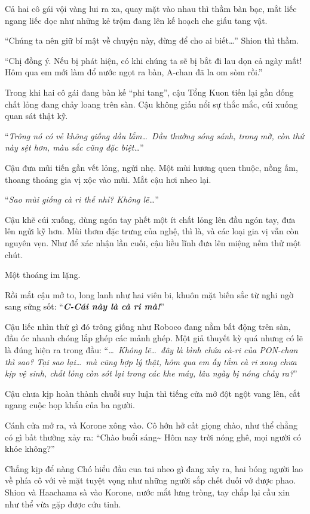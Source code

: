 \documentclass[../main.tex]{subfiles}
\begin{document}
Cả hai cô gái vội vàng lui ra xa, quay mặt vào nhau thì thầm bàn bạc, mắt liếc ngang liếc dọc như những kẻ trộm đang lên kế hoạch che giấu tang vật.

``Chúng ta nên giữ bí mật về chuyện này, đừng để cho ai biết\dots''  Shion thì thầm.

``Chị đồng ý. Nếu bị phát hiện, có khi chúng ta sẽ bị bắt đi lau dọn cả ngày mất! Hôm qua em mới làm đổ nước ngọt ra bàn, A-chan đã la om sòm rồi.''

Trong khi hai cô gái đang bàn kế ``phi tang'', cậu Tổng Kuon tiến lại gần đống chất lỏng đang chảy loang trên sàn. Cậu không giấu nổi sự thắc mắc, cúi xuống quan sát thật kỹ.

``\textit{Trông nó có vẻ không giống dầu lắm\dots\ Dầu thường sóng sánh, trong mờ, còn thứ này sệt hơn, màu sắc cũng đặc biệt\dots}''

Cậu đưa mũi tiến gần vết lỏng, ngửi nhẹ. Một mùi hương quen thuộc, nồng ấm, thoang thoảng gia vị xộc vào mũi. Mắt cậu hơi nheo lại.

``\textit{Sao mùi giống cà ri thế nhỉ? Không lẽ\dots}''

Cậu khẽ cúi xuống, dùng ngón tay phết một ít chất lỏng lên đầu ngón tay, đưa lên ngửi kỹ hơn. Mùi thơm đặc trưng của nghệ, thì là, và các loại gia vị vẫn còn nguyên vẹn. Như để xác nhận lần cuối, cậu liều lĩnh đưa lên miệng nếm thử một chút.

Một thoáng im lặng.

Rồi mắt cậu mở to, long lanh như hai viên bi, khuôn mặt biến sắc từ nghi ngờ sang sửng sốt: ``\textbf{\textit{C-Cái này là cà ri mà!}}''

Cậu liếc nhìn thứ gì đó trông giống như Roboco đang nằm bất động trên sàn, đầu óc nhanh chóng lắp ghép các mảnh ghép. Một giả thuyết kỳ quá  nhưng có lẽ là đúng hiện ra trong đầu: ``\textit{\dots\ Không lẽ\dots\ đây là bình chứa cà-ri của PON-chan thì sao? Tại sao lại\dots\ mà cũng hợp lý thật, hôm qua em ấy tắm cà ri xong chưa kịp vệ sinh, chất lỏng còn sót lại trong các khe máy, lâu ngày bị nóng chảy ra?}''

Cậu chưa kịp hoàn thành chuỗi suy luận thì tiếng cửa mở đột ngột vang lên, cắt ngang cuộc họp khẩn của ba người.

Cánh cửa mở ra, và Korone xông vào. Cô hớn hở cất giọng chào, như thể chẳng có gì bất thường xảy ra: ``Chào buổi sáng\~{} Hôm nay trời nóng ghê, mọi người có khỏe không?''

Chẳng kịp để nàng Chó hiểu đầu cua tai nheo gì đang xảy ra, hai bóng người lao về phía cô với vẻ mặt tuyệt vọng như những người sắp chết đuối vớ được phao. Shion và Haachama sà vào Korone, nước mắt lưng tròng, tay chắp lại cầu xin như thể vừa gặp được cứu tinh.
\end{document}
